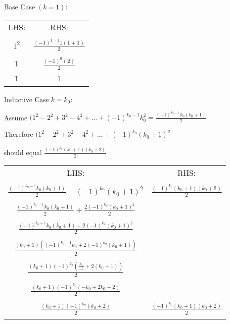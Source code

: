 \documentclass{article}
\begin{document}
\begin{enumerate}
    Base Case $(k=1)$:
    \begin{center}
        \begin{tabular}{ c | c } 
        LHS: & RHS: \\ & \\
        $ 1^2 $ & $ \frac{(-1)^{1-1}1(1+1)}{2} $ \\ \\
        $ 1 $ & $ \frac{(-1)^{0}(2)}{2} $ \\ \\
        $ 1 $ & $ 1 $ \\ \\
        \end{tabular}
    \end{center}
    Inductive Case $ k = k_0 $:
    
        Assume $ (1^2-2^2+3^2-4^2+...+(-1)^{k_0-1}k_0^2 = \frac{(-1)^{k_0-1}k_0(k_0+1)}{2} $

        Therefore $ (1^2-2^2+3^2-4^2+...+(-1)^{k_0}(k_0+1)^2 $ 
        
        should equal $ \frac{(-1)^{k_0}(k_0+1)(k_0+2)}{2} $

    \begin{center}
        \begin{tabular}{ c | c } 
        LHS: & RHS: \\ \\
        $ \frac{(-1)^{k_0-1}k_0(k_0+1)}{2} + (-1)^{k_0}(k_0+1)^2 $ & $ \frac{(-1)^{k_0}(k_0+1)(k_0+2)}{2} $ \\ \\
        $ \frac{(-1)^{k_0-1}k_0(k_0+1)}{2} + \frac{2(-1)^{k_0}(k_0+1)^2}{2} $ &  \\ \\
        $ \frac{(-1)^{k_0-1}k_0(k_0+1) + 2(-1)^{k_0}(k_0+1)^2}{2}  $ &  \\ \\
        $ \frac{(k_0+1)((-1)^{k_0-1}k_0+2(-1)^{k_0}(k_0+1))}{2}  $ &  \\ \\
        $ \frac{(k_0+1)(-1)^{k_0}(\frac{k_0}{-1}+2(k_0+1))}{2}  $ &  \\ \\
        $ \frac{(k_0+1)(-1)^{k_0}(-k_0+2k_0+2)}{2}  $ &  \\ \\
        $ \boxed{\frac{(k_0+1)(-1)^{k_0}(k_0+2)}{2}}  $ &  $\boxed{\frac{(-1)^{k_0}(k_0+1)(k_0+2)}{2}}$\\ \\
        \end{tabular}
    \end{center}
    

\end{enumerate}
\end{document}
